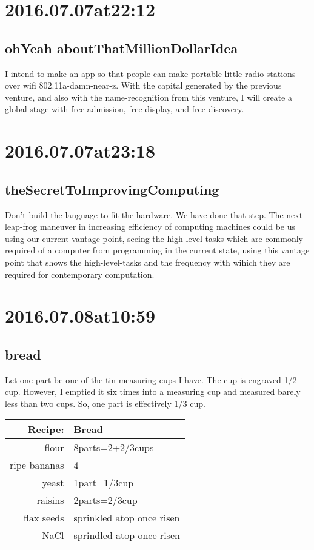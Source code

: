 \begin{enumerate}
\begin{enumerate}
\section*{ 2016.07.07at22:12 }
\subsection*{ ohYeah aboutThatMillionDollarIdea }
I intend to make an app so that people can make portable little radio stations over wifi 802.11a-damn-near-z. With the capital generated by the previous venture, and also with the name-recognition from this venture, I will create a global stage with free admission, free display, and free discovery.

\section*{ 2016.07.07at23:18 }
\subsection*{ theSecretToImprovingComputing }
Don't build the language to fit the hardware. We have done that step. The next leap-frog maneuver in increasing efficiency of computing machines could be us using our current vantage point, seeing the high-level-tasks which are commonly required of a computer from programming in the current state, using this vantage point that shows the high-level-tasks and the frequency with wihich they are required for contemporary computation.

\section*{ 2016.07.08at10:59 }
\subsection*{ bread }
Let one part be one of the tin measuring cups I have. The cup is engraved 1/2 cup. However, I emptied it six times into a measuring cup and measured barely less than two cups. So, one part is effectively 1/3 cup.
\begin{center}
\begin{tabular}{|r|l|}
\hline
Recipe:&Bread\\
\hline
flour           &   8parts=2+2/3cups\\
ripe bananas    &   4\\
yeast           &   1part=1/3cup\\
raisins         &   2parts=2/3cup\\
flax seeds      &   sprinkled atop once risen\\
NaCl            &   sprindled atop once risen\\
\hline
\end{tabular}
\end{center}


\end{enumerate}
\end{enumerate}
